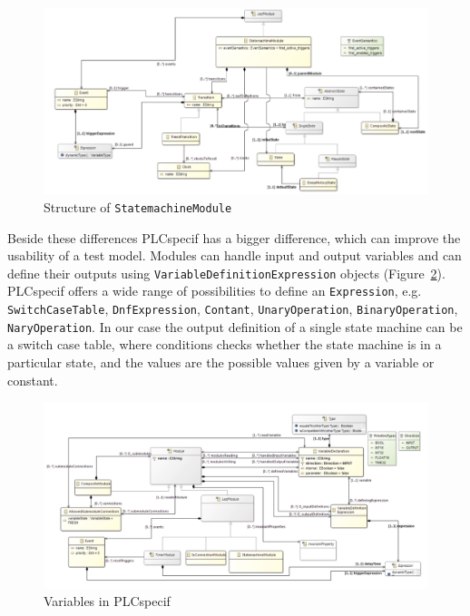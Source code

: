 \begin{figure}[htp]
\centering
\includegraphics[scale=0.5]{figures/plchsm_statemachine}
\caption{Structure of \texttt{StatemachineModule} \cite{plcspecif}}
\label{fig:plchsm_statemachine}
\end{figure}

Beside these differences PLCspecif has a bigger difference, which can improve the usability of a test model. Modules can handle input and output variables and can define their outputs using \texttt{VariableDefinitionExpression} objects (Figure~\ref{fig:plchsm_variables}). PLCspecif offers a wide range of possibilities to define an \texttt{Expression}, e.g. \texttt{SwitchCaseTable}, \texttt{DnfExpression}, \texttt{Contant}, \texttt{UnaryOperation}, \texttt{BinaryOperation}, \texttt{NaryOperation}. In our case the output definition of a single state machine can be a switch case table, where conditions checks whether the state machine is in a particular state, and the values are the possible values given by a variable or constant.

\begin{figure}[htp]
\centering
\includegraphics[scale=0.6]{figures/plchsm_variables}
\caption{Variables in PLCspecif \cite{plcspecif}}
\label{fig:plchsm_variables}
\end{figure}

